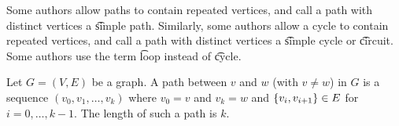 
Some authors allow paths to contain repeated vertices, and call a path with distinct vertices a \t{simple path}.
Similarly, some authors allow a cycle to contain repeated vertices, and call a path with distinct vertices a \t{simple cycle} or \t{circuit}.
Some authors use the term \t{loop} instead of \t{cycle}.


Let $G = (V, E)$ be a graph.
A path between $v$ and $w$ (with $v \neq w$) in $G$ is a sequence $(v_0, v_1, \dots, v_k)$ where $v_0 = v$ and $v_k = w$ and $\{v_i, v_{i+1}\} \in E$ for $i = 0, \dots, k-1$.
The length of such a path is $k$.
\strats
